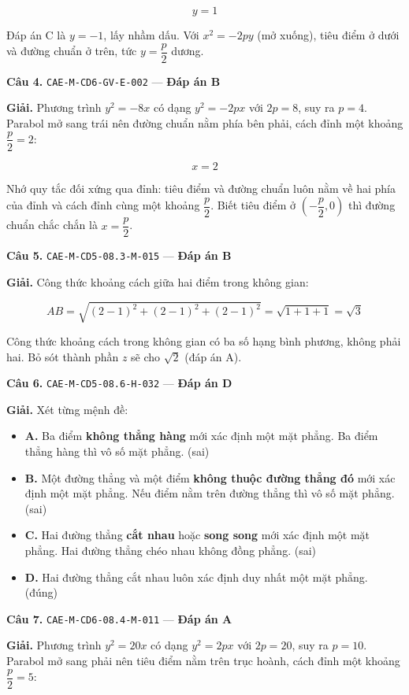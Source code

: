 \documentclass[11pt, a4paper]{article}
\begin{document}
$$y = 1$$

 Đáp án C là $y = -1$, lấy nhầm dấu. Với $x^2 = -2py$ (mở xuống), tiêu điểm ở dưới và đường chuẩn ở trên, tức $y = \dfrac{p}{2}$ dương.

\textbf{Câu 4.} \texttt{CAE-M-CD6-GV-E-002} — \textbf{Đáp án B}

\textbf{Giải.} Phương trình $y^2 = -8x$ có dạng $y^2 = -2px$ với $2p = 8$, suy ra $p = 4$. Parabol mở sang trái nên đường chuẩn nằm phía bên phải, cách đỉnh một khoảng $\dfrac{p}{2} = 2$:

$$x = 2$$

 Nhớ quy tắc đối xứng qua đỉnh: tiêu điểm và đường chuẩn luôn nằm về hai phía của đỉnh và cách đỉnh cùng một khoảng $\dfrac{p}{2}$. Biết tiêu điểm ở $\left(-\dfrac{p}{2}, 0\right)$ thì đường chuẩn chắc chắn là $x = \dfrac{p}{2}$.

\textbf{Câu 5.} \texttt{CAE-M-CD5-08.3-M-015} — \textbf{Đáp án B}

\textbf{Giải.} Công thức khoảng cách giữa hai điểm trong không gian:

$$AB = \sqrt{(2-1)^2 + (2-1)^2 + (2-1)^2} = \sqrt{1 + 1 + 1} = \sqrt{3}$$

 Công thức khoảng cách trong không gian có ba số hạng bình phương, không phải hai. Bỏ sót thành phần $z$ sẽ cho $\sqrt{2}$ (đáp án A).

\textbf{Câu 6.} \texttt{CAE-M-CD5-08.6-H-032} — \textbf{Đáp án D}

\textbf{Giải.} Xét từng mệnh đề:

\begin{itemize}[leftmargin=1.4em, itemsep=2pt]
\item \textbf{A.} Ba điểm \textbf{không thẳng hàng} mới xác định một mặt phẳng. Ba điểm thẳng hàng thì vô số mặt phẳng. (sai)
\item \textbf{B.} Một đường thẳng và một điểm \textbf{không thuộc đường thẳng đó} mới xác định một mặt phẳng. Nếu điểm nằm trên đường thẳng thì vô số mặt phẳng. (sai)
\item \textbf{C.} Hai đường thẳng \textbf{cắt nhau} hoặc \textbf{song song} mới xác định một mặt phẳng. Hai đường thẳng chéo nhau không đồng phẳng. (sai)
\item \textbf{D.} Hai đường thẳng cắt nhau luôn xác định duy nhất một mặt phẳng. (đúng)
\end{itemize}

\textbf{Câu 7.} \texttt{CAE-M-CD6-08.4-M-011} — \textbf{Đáp án A}

\textbf{Giải.} Phương trình $y^2 = 20x$ có dạng $y^2 = 2px$ với $2p = 20$, suy ra $p = 10$. Parabol mở sang phải nên tiêu điểm nằm trên trục hoành, cách đỉnh một khoảng $\dfrac{p}{2} = 5$:
\end{document}
